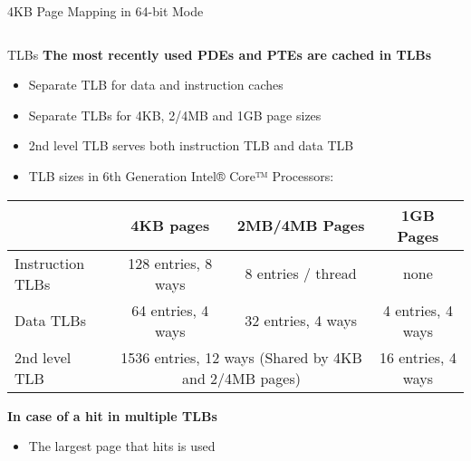 \documentclass[aspectratio=169,12pt]{beamer}
\begin{document}
\begin{frame}{4KB Page Mapping in 64-bit Mode}
\begin{columns}[T]
\begin{column}{0.56\textwidth}
\begin{center}
\end{center}
\end{column}
\end{columns}
\end{frame}



\begin{frame}{TLBs}
\textbf{The most recently used PDEs and PTEs are cached in TLBs}
\begin{itemize}
\item Separate TLB for data and instruction caches
\item Separate TLBs for 4KB, 2/4MB and 1GB page sizes
\item 2nd level TLB serves both instruction TLB and data TLB
\item TLB sizes in 6th Generation Intel® Core™ Processors:
\end{itemize}

\begin{center}
\footnotesize
\begin{tabular}{|l|c|c|c|}
\hline
 & \textbf{4KB pages} & \textbf{2MB/4MB Pages} & \textbf{1GB Pages} \\
\hline
Instruction TLBs & 128 entries, 8 ways & 8 entries / thread & none \\
\hline
Data TLBs & 64 entries, 4 ways & 32 entries, 4 ways & 4 entries, 4 ways \\
\hline
2nd level TLB & \multicolumn{2}{c|}{1536 entries, 12 ways (Shared by 4KB and 2/4MB pages)} & 16 entries, 4 ways \\
\hline
\end{tabular}
\end{center}

\textbf{In case of a hit in multiple TLBs}
\begin{itemize}
\item The largest page that hits is used
\end{itemize}
\end{frame}
\end{document}

